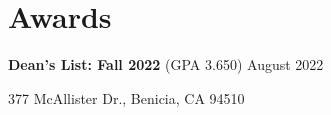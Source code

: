 \documentclass[letterpaper, 11pt]{article}
\makeatletter
\newcommand{\resumeItem}[1]{
  \item\small{
    {#1 \vspace{-2pt}}
  }
}
\newcommand{\resumeProjectHeading}[2]{
    \item
    \begin{tabular*}{0.97\textwidth}{l@{\extracolsep{\fill}}r}
      \small#1 & #2 \\
    \end{tabular*}\vspace{-7pt}
}
\newcommand{\resumeSubHeadingListStart}{\begin{itemize}[leftmargin=0.15in, label={}]}
\newcommand{\resumeSubHeadingListEnd}{\end{itemize}}
\newcommand{\resumeItemListStart}{\begin{itemize}}
\newcommand{\resumeItemListEnd}{\end{itemize}\vspace{-5pt}}
\makeatother
\begin{document}

\section{Awards}
\begin{itemize}[leftmargin=0.15in, label={}]
    \small{
    \item{
        \textbf{Dean's List: Fall 2022}\hspace{1pt} (GPA 3.650) \hspace*{\fill} August 2022
    }
}
\end{itemize}

\begin{center}
  \tiny 377 McAllister Dr., Benicia, CA 94510
\end{center}
\end{document}
